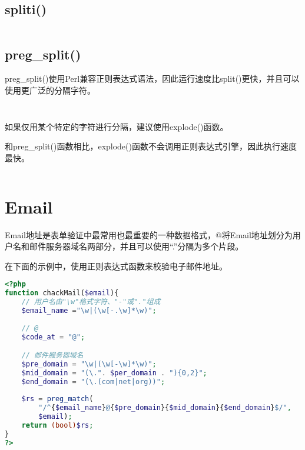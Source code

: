 \begin{lstlisting}[language=PHP]

\end{lstlisting}


\section{spliti()}



\begin{lstlisting}[language=PHP]

\end{lstlisting}

\section{preg\_split()}

preg\_split()使用Perl兼容正则表达式语法，因此运行速度比split()更快，并且可以使用更广泛的分隔字符。



\begin{lstlisting}[language=PHP]

\end{lstlisting}


\begin{lstlisting}[language=PHP]

\end{lstlisting}

如果仅用某个特定的字符进行分隔，建议使用explode()函数。

和preg\_split()函数相比，explode()函数不会调用正则表达式引擎，因此执行速度最快。


\begin{lstlisting}[language=PHP]

\end{lstlisting}


\chapter{Email}

Email地址是表单验证中最常用也最重要的一种数据格式，@将Email地址划分为用户名和邮件服务器域名两部分，并且可以使用“.”分隔为多个片段。

在下面的示例中，使用正则表达式函数来校验电子邮件地址。


\begin{lstlisting}[language=PHP]
<?php
function chackMail($email){
	// 用户名由"\w"格式字符、"-"或"."组成
	$email_name ="\w|(\w[-.\w]*\w)";
	
	// @
	$code_at = "@";

	// 邮件服务器域名
	$pre_domain = "\w|(\w[-\w]*\w)";
	$mid_domain = "(\.". $per_domain . "){0,2}";
	$end_domain = "(\.(com|net|org))";
	
	$rs = preg_match(
		"/^{$email_name}@{$pre_domain}{$mid_domain}{$end_domain}$/",
		$email);
	return (bool)$rs;
}
?>
\end{lstlisting}

